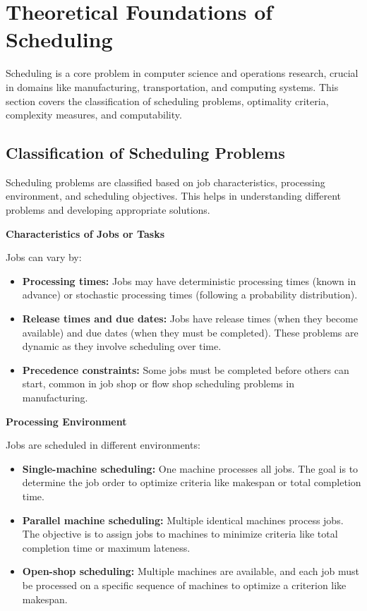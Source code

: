 \documentclass[12pt]{book} %
\begin{document}
\section{Theoretical Foundations of Scheduling}

Scheduling is a core problem in computer science and operations research, crucial in domains like manufacturing, transportation, and computing systems. This section covers the classification of scheduling problems, optimality criteria, complexity measures, and computability.

\subsection{Classification of Scheduling Problems}

Scheduling problems are classified based on job characteristics, processing environment, and scheduling objectives. This helps in understanding different problems and developing appropriate solutions.

\textbf{Characteristics of Jobs or Tasks}

Jobs can vary by:

\begin{itemize}
    \item \textbf{Processing times:} Jobs may have deterministic processing times (known in advance) or stochastic processing times (following a probability distribution).
    \item \textbf{Release times and due dates:} Jobs have release times (when they become available) and due dates (when they must be completed). These problems are dynamic as they involve scheduling over time.
    \item \textbf{Precedence constraints:} Some jobs must be completed before others can start, common in job shop or flow shop scheduling problems in manufacturing.
\end{itemize}

\textbf{Processing Environment}

Jobs are scheduled in different environments:

\begin{itemize}
    \item \textbf{Single-machine scheduling:} One machine processes all jobs. The goal is to determine the job order to optimize criteria like makespan or total completion time.
    \item \textbf{Parallel machine scheduling:} Multiple identical machines process jobs. The objective is to assign jobs to machines to minimize criteria like total completion time or maximum lateness.
    \item \textbf{Open-shop scheduling:} Multiple machines are available, and each job must be processed on a specific sequence of machines to optimize a criterion like makespan.
\end{itemize}
\end{document}

